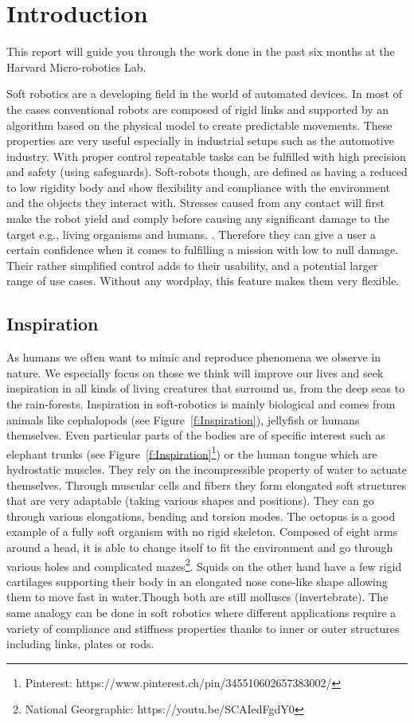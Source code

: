 \section{Introduction}
\label{s:Introduction}
This report will guide you through the work done in the past six months at the Harvard Micro-robotics Lab. 

Soft robotics are a developing field in  the world of automated devices. In most of the cases conventional robots are composed of rigid links  and supported by an algorithm based on the physical model to create predictable movements. These properties are very useful especially in industrial setups such as the automotive industry. With proper control repeatable tasks can be fulfilled with high precision and safety (using safeguards).  Soft-robots though,  are defined as having a reduced to low rigidity body and show flexibility and compliance with the environment and the objects they interact with. Stresses caused from any contact will first make the robot yield and comply before causing any significant damage to the target e.g., living organisms and humans. \cite{trivedi2008soft, rus2015design, polygerinos2017soft}. Therefore they can give a user a certain confidence when it comes to fulfilling a mission with low to null damage. Their rather simplified control adds to their usability, and a potential larger range of use cases. Without any wordplay, this feature makes them very flexible.

\subsection{Inspiration}
\label{s:Inspiration}
As humans we often want to mimic and reproduce phenomena we observe in nature. We especially focus on those we think will improve our lives and seek inspiration in all kinds of living creatures that surround us, from the deep seas to the rain-forests. 
Inspiration in soft-robotics is mainly biological and comes from animals like cephalopods (see Figure~\ref{f:Inspiration}), jellyfish or humans themselves. Even particular parts of the bodies are of specific interest such as elephant trunks (see Figure~\ref{f:Inspiration}\footnote{Pinterest: https://www.pinterest.ch/pin/345510602657383002/}) or the human tongue which are hydrostatic muscles. They rely on the incompressible property of water to actuate themselves. Through muscular cells and fibers they form elongated soft structures that are very adaptable (taking various shapes and positions). They can go through various elongations, bending and torsion modes. The octopus is a good example of a fully soft organism with no rigid skeleton. Composed of eight arms around a head, it is able to change itself to fit the environment and go through various holes and complicated mazes\footnote{National Georgraphic: https://youtu.be/SCAIedFgdY0}. Squids on the other hand have a few rigid cartilages supporting their body in an elongated nose cone-like shape allowing them to move fast in water.Though both are still molluscs (invertebrate). The same analogy can be done in soft robotics where different applications require a variety of compliance and stiffness properties thanks to inner or outer structures including links, plates or rods.

